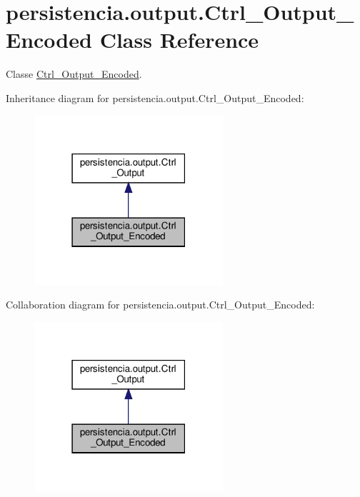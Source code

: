 \hypertarget{classpersistencia_1_1output_1_1Ctrl__Output__Encoded}{}\section{persistencia.\+output.\+Ctrl\+\_\+\+Output\+\_\+\+Encoded Class Reference}
\label{classpersistencia_1_1output_1_1Ctrl__Output__Encoded}


Classe \hyperlink{classpersistencia_1_1output_1_1Ctrl__Output__Encoded}{Ctrl\+\_\+\+Output\+\_\+\+Encoded}.  




Inheritance diagram for persistencia.\+output.\+Ctrl\+\_\+\+Output\+\_\+\+Encoded\+:\nopagebreak
\begin{figure}[H]
\begin{center}
\leavevmode
\includegraphics[width=198pt]{classpersistencia_1_1output_1_1Ctrl__Output__Encoded__inherit__graph}
\end{center}
\end{figure}


Collaboration diagram for persistencia.\+output.\+Ctrl\+\_\+\+Output\+\_\+\+Encoded\+:\nopagebreak
\begin{figure}[H]
\begin{center}
\leavevmode
\includegraphics[width=198pt]{classpersistencia_1_1output_1_1Ctrl__Output__Encoded__coll__graph}
\end{center}
\end{figure}
